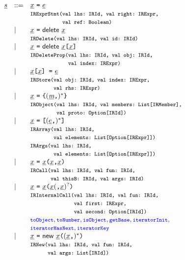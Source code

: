 \[\begin{array}{llll}
\ir\stmt & ::= & \irid \ \verb+=+ \ \ir\expr \\
&& \mtt{IRExprStmt(val lhs:~IRId, val right:~IRExpr,}\\
&&\mtt{\phantom{IRExprStmt(}val ref:~Boolean)}\\
&\mid& \irid \ \verb+=+ \ {\sf delete}\ \irid\\
&& \mtt{IRDelete(val lhs:~IRId, val id:~IRId)}\\
&\mid& \irid \ \verb+=+ \ {\sf delete}\ \irid\verb+[+\irid\verb+]+\\
&& \mtt{IRDeleteProp(val lhs:~IRId, val obj:~IRId,}\\
&&\mtt{\phantom{IRDeleteProp(}val index:~IRExpr)}\\
&\mid& \irid\verb+[+\irid\verb+] =+ \ \irexpr \\
&& \mtt{IRStore(val obj:~IRId, val index:~IRExpr,}\\
&&\mtt{\phantom{IRStore(}val rhs:~IRExpr)}\\
 &\mid& \irid \ \verb+=+ \ \verb+{+ (\ir\member\verb+,+)^* \verb+}+\\
&& \mtt{IRObject(val lhs:~IRId, val members:~List[IRMember],}\\
&&\mtt{\phantom{IRObject(}val proto:~Option[IRId])}\\
 &\mid& \irid \ \verb+=+ \ \verb+[+ (\irexpr\verb+,+)^* \verb+]+ \\
&& \mtt{IRArray(val lhs:~IRId,}\\
&&\mtt{\phantom{IRArray(}val elements:~List[Option[IRExpr]])}\\
&&\mtt{IRArgs(val lhs:~IRId,}\\
&&\mtt{\phantom{IRArray(}val elements:~List[Option[IRExpr]])}\\
 &\mid& \irid \ \verb+=+ \ \irid\verb+(+\irid\verb+,+\irid\verb+)+\\
&& \mtt{IRCall(val lhs:~IRId, val fun:~IRId,}\\
&&\mtt{\phantom{IRCall(}val thisB:~IRId, val args:~IRId)}\\
 &\mid& \irid \ \verb+=+ \ \irid\verb+(+\irid(\verb+,+\irid)^?\verb+)+\\
&& \mtt{IRInternalCall(val lhs:~IRId, val fun:~IRId,}\\
&&\mtt{\phantom{IRInternalCall(}val first:~IRExpr,}\\
&&\mtt{\phantom{IRInternalCall(}val second:~Option[IRId])}\\
&&{\inblue \mtt{toObject}, \mtt{toNumber}, \mtt{isObject},
\mtt{getBase}, \mtt{iteratorInit},}\\
&&{\inblue \mtt{iteratorHasNext}, \mtt{iteratorKey}}\\

 &\mid& \irid \ \verb+=+ \ {\sf new}\ \irid\verb+(+(\irid\verb+,+)^*\verb+)+\\
&& \mtt{IRNew(val lhs:~IRId, val fun:~IRId,}\\
&&\mtt{\phantom{IRNew(}val args:~List[IRId])}\\
\end{array}
\]


